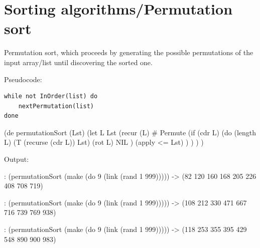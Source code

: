 \begin{itemize}
\begin{wideverbatim}
\end{wideverbatim}

\pagebreak{}
\section*{Sorting algorithms/Permutation sort}

Permutation sort, which proceeds by generating the possible permutations
of the input array/list until discovering the sorted one.

Pseudocode:

\begin{verbatim}
while not InOrder(list) do
    nextPermutation(list)
done
\end{verbatim}



\begin{wideverbatim}

(de permutationSort (Lst)
   (let L Lst
      (recur (L)  # Permute
         (if (cdr L)
            (do (length L)
               (T (recurse (cdr L)) Lst)
               (rot L)
               NIL )
            (apply <= Lst) ) ) ) )

Output:

: (permutationSort (make (do 9 (link (rand 1 999)))))
-> (82 120 160 168 205 226 408 708 719)

: (permutationSort (make (do 9 (link (rand 1 999)))))
-> (108 212 330 471 667 716 739 769 938)

: (permutationSort (make (do 9 (link (rand 1 999)))))
-> (118 253 355 395 429 548 890 900 983)

\end{wideverbatim}






\end{itemize}
